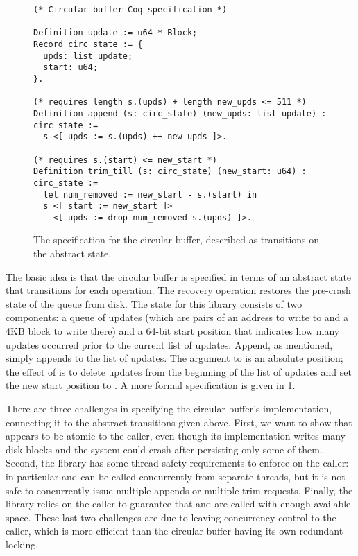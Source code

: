 \begin{figure}[ht]
\begin{verbatim}
(* Circular buffer Coq specification *)

Definition update := u64 * Block;
Record circ_state := {
  upds: list update;
  start: u64;
}.

(* requires length s.(upds) + length new_upds <= 511 *)
Definition append (s: circ_state) (new_upds: list update) : circ_state :=
  s <[ upds := s.(upds) ++ new_upds ]>.

(* requires s.(start) <= new_start *)
Definition trim_till (s: circ_state) (new_start: u64) : circ_state :=
  let num_removed := new_start - s.(start) in
  s <[ start := new_start ]>
    <[ upds := drop num_removed s.(upds) ]>.
\end{verbatim}
  \caption{The specification for the circular buffer, described as transitions
    on the abstract state.}
  \label{fig:circ:spec}
\end{figure}

The basic idea is that the circular buffer is specified in terms of an abstract
state that transitions for each operation. The recovery operation
restores the pre-crash state of the queue from disk. The state for this library consists
of two components: a queue of updates (which are pairs of an address to write to
and a 4KB block to write there) and a 64-bit start position that indicates how
many updates occurred prior to the current list of updates. Append, as
mentioned, simply appends to the list of updates. The argument to 
is an absolute position; the effect of  is to delete
 updates from the beginning of the list of updates and set the
new start position to . A more formal specification is given in
\cref{fig:circ:spec}.

There are three challenges in specifying the circular buffer's implementation,
connecting it to the abstract transitions given above. First, we
want to show that  appears to be atomic to the caller, even though
its implementation writes many disk blocks and the system could crash after
persisting only some of them. Second, the library has some thread-safety
requirements to enforce on the caller: in particular  and
 can be called concurrently from separate threads, but it is not
safe to concurrently issue multiple appends or multiple trim requests. Finally, the library
relies on the caller to guarantee that  and  are called with enough
available space. These last two challenges are due to leaving concurrency
control to the caller, which is more efficient than the circular buffer having
its own redundant locking.

